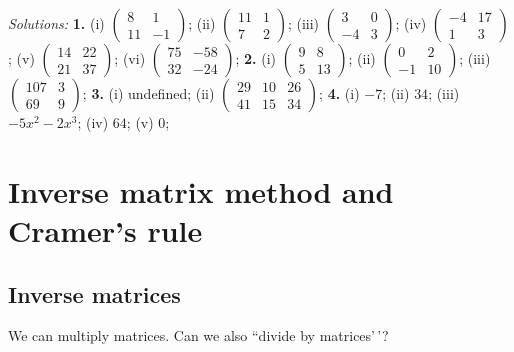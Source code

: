 \documentclass[
  12pt,
  oneside]{book}
\theoremstyle{definition}
\theoremstyle{definition}
\theoremstyle{definition}
\theoremstyle{definition}
\theoremstyle{remark}
\begin{document}
\emph{Solutions:}
\textbf{1.} (i) \(\begin{pmatrix}8&1\\11&-1\end{pmatrix}\);
(ii) \(\begin{pmatrix}11&1\\7&2\end{pmatrix}\);
(iii) \(\begin{pmatrix}3&0\\-4&3\end{pmatrix}\);
(iv) \(\begin{pmatrix}-4&17\\1&3\end{pmatrix}\);
(v) \(\begin{pmatrix}14&22\\21&37\end{pmatrix}\);
(vi) \(\begin{pmatrix}75&-58\\32&-24\end{pmatrix}\);
\textbf{2.} (i) \(\begin{pmatrix}9&8\\5&13\end{pmatrix}\);
(ii) \(\begin{pmatrix}0&2\\-1&10\end{pmatrix}\);
(iii) \(\begin{pmatrix}107&3\\69&9\end{pmatrix}\);
\textbf{3.} (i) undefined; (ii) \(\begin{pmatrix}29&10&26\\41&15&34\end{pmatrix}\);
\textbf{4.} (i) \(-7\); (ii) \(34\); (iii) \(-5x^2-2x^3\); (iv) \(64\); (v) \(0\);

\hypertarget{inverse-matrix-method-and-cramers-rule}{%
\chapter{Inverse matrix method and Cramer's rule}\label{inverse-matrix-method-and-cramers-rule}}

\hypertarget{inverse-matrices}{%
\section{Inverse matrices}\label{inverse-matrices}}

We can multiply matrices. Can we also ``divide by matrices'\,'?
\end{document}
